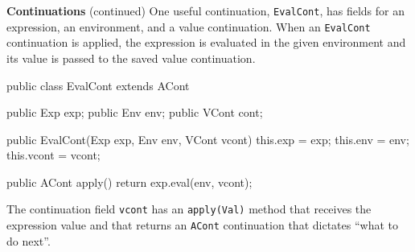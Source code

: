 \begin{minipage}[t]{\sw}
\slidenumber
\LARGE
{\bf Continuations} (continued)\exx
\Large
One useful continuation, \verb'EvalCont',
has fields for an expression, an environment, and a value continuation.
When an \verb'EvalCont' continuation is applied,
the expression is evaluated in the given environment
and its value is passed to the saved value continuation.
\Large
\begin{qv}
public class EvalCont extends ACont {

    public Exp exp;
    public Env env;
    public VCont cont;

    public EvalCont(Exp exp, Env env, VCont vcont) {
        this.exp = exp;
        this.env = env;
        this.vcont = vcont;
    }

    public ACont apply() {
        return exp.eval(env, vcont);
    }
}
\end{qv}
\Large
The continuation field \verb'vcont'
has an \verb'apply(Val)' method
that receives the expression value
and that returns an \verb'ACont' continuation
that dictates ``what to do next''.
\end{minipage}
